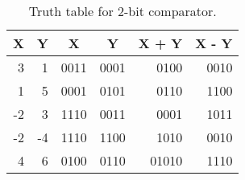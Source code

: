\documentclass{article}
\begin{document}
\begin{table}[hbtp]
  \centering
  \begin{tabular}{r|r|c|c|r|r}
    X  & Y  & X    & Y    & X + Y & X - Y \\
    \hline
    3  & 1  & 0011 & 0001 & 0100  & 0010  \\
    1  & 5  & 0001 & 0101 & 0110  & 1100  \\
    -2 & 3  & 1110 & 0011 & 0001  & 1011  \\
    -2 & -4 & 1110 & 1100 & 1010  & 0010  \\
    4  & 6  & 0100 & 0110 & 01010 & 1110  \\
\end{tabular}

  \caption{\label{tab:truth}Truth table for 2-bit comparator.}
\end{table}




\end{document}
